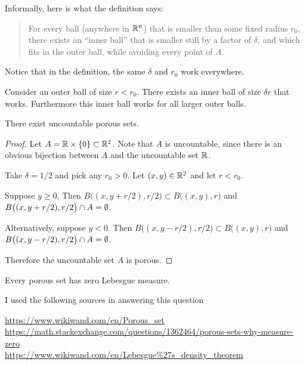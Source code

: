 Informally, here is what the definition says:

\begin{quote}
  For every ball (anywhere in $\mathbb{R}^n$) that is smaller than some fixed radius $r_0$, there exists an ``inner
  ball​'' that is smaller still by a factor of $\delta$, and which fits in the outer ball, while avoiding every
  point of $A$.
\end{quote}

Notice that in the definition, the same $\delta$ and $r_0$ work everywhere.

Consider an outer ball of size $r < r_0$. There exists an inner ball of size $\delta r$ that works. Furthermore
this inner ball works for all larger outer balls.

\begin{claim}
  There exist uncountable porous sets.
\end{claim}

\begin{proof}
  Let $A = \mathbb{R} \times \{0\} \subset \mathbb{R}^2$. Note that $A$ is uncountable, since there is an obvious bijection
  between $A$ and the uncountable set $\mathbb{R}$.

  Take $\delta = 1/2$ and pick any $r_0 > 0$. Let $(x, y) \in \mathbb{R}^2$ and let $r < r_0$.

  Suppose $y \geq 0$. Then $B\big((x, y + r/2), r/2\big) \subset B\big((x, y), r\big)$
  and $B\big((x, y + r/2), r/2\big) \cap A = \emptyset$.

  Alternatively, suppose $y < 0$. Then $B\big((x, y - r/2), r/2\big) \subset B\big((x, y), r\big)$
  and $B\big((x, y - r/2), r/2\big) \cap A = \emptyset$.

  Therefore the uncountable set $A$ is porous.
\end{proof}

\begin{claim}
  Every porous set has zero Lebesgue measure.
\end{claim}

I used the following sources in answering this question

\url{https://www.wikiwand.com/en/Porous_set}\\
\url{https://math.stackexchange.com/questions/1362464/porous-sets-why-measure-zero}\\
\url{https://www.wikiwand.com/en/Lebesgue\%27s_density_theorem}\\

